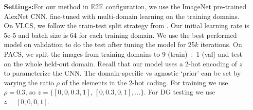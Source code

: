 \documentclass[10pt,twocolumn,letterpaper]{article}
\begin{document}
\vspace{0.1cm}\noindent\textbf{Settings:}\quad For our method in E2E configuration, we use the ImageNet pre-trained AlexNet CNN, fine-tuned with multi-domain learning on the training domains. On VLCS, we follow the train-test split strategy from \cite{ghifary2015domain}. 
Our initial learning rate is 5e-5 and batch size is 64 for each training domain. We use the best performed model on validation to do the test after tuning the model for 25$k$ iterations.  On PACS, we split the images from training domains to 9 (train)~:~1 (val) and test on the whole held-out domain. 
Recall that our model uses a 2-hot encoding of $z$ to parameterize the CNN. The domain-specific vs agnostic `prior' can be set by varying the ratio $\rho$ of the elements in the 2-hot coding. For training we use $\rho=0.3$, so  $z=\{[0, 0, 0.3, 1]$, $[0, 0.3, 0, 1],...\}$. For DG testing  we use $z=[0,0,0,1]$.
\begin{table*}[t]
\small
\begin{center}
\caption{Comparison against Undo-Bias \cite{ECCV12_Khosla} on the VLCS benchmark using classic SIFT-BOW features, and our shallow model Ours-MLP. Average precision (\%) and mean average precision (\%) of binary 1-v-all classification in unseen domains.}
\label{tab:binary+shallow}
\end{center}
\end{table*}
\end{document}
